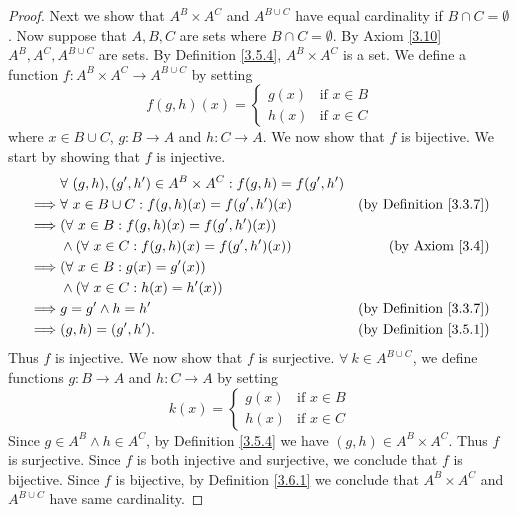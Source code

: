 \begin{proof}
    Next we show that \(A^B \times A^C\) and \(A^{B \cup C}\) have equal cardinality if \(B \cap C = \emptyset\).
    Now suppose that \(A, B, C\) are sets where \(B \cap C = \emptyset\).
    By Axiom \ref{3.10} \(A^B, A^C, A^{B \cup C}\) are sets.
    By Definition \ref{3.5.4}, \(A^B \times A^C\) is a set.
    We define a function \(f : A^B \times A^C \to A^{B \cup C}\) by setting
    \[
        f(g, h)(x) = \begin{cases}
            g(x) & \text{if } x \in B \\
            h(x) & \text{if } x \in C
        \end{cases}
    \]
    where \(x \in B \cup C\), \(g : B \to A\) and \(h : C \to A\).
    We now show that \(f\) is bijective.
    We start by showing that \(f\) is injective.
    \begin{align*}
                 & \forall\ (g, h), (g', h') \in A^B \times A^C : f(g, h) = f(g', h')                                      \\
        \implies & \forall\ x \in B \cup C : f(g, h)(x) = f(g', h')(x)                & \text{(by Definition \ref{3.3.7})} \\
        \implies & (\forall\ x \in B : f(g, h)(x) = f(g', h')(x))                                                          \\
                 & \land (\forall\ x \in C : f(g, h)(x) = f(g', h')(x))               & \text{(by Axiom \ref{3.4})}        \\
        \implies & (\forall\ x \in B : g(x) = g'(x))                                                                       \\
                 & \land (\forall\ x \in C : h(x) = h'(x))                                                                 \\
        \implies & g = g' \land h = h'                                                & \text{(by Definition \ref{3.3.7})} \\
        \implies & (g, h) = (g', h').                                                 & \text{(by Definition \ref{3.5.1})}
    \end{align*}
    Thus \(f\) is injective.
    We now show that \(f\) is surjective.
    \(\forall\ k \in A^{B \cup C}\), we define functions \(g : B \to A\) and \(h : C \to A\) by setting
    \[
        k(x) = \begin{cases}
            g(x) & \text{if } x \in B \\
            h(x) & \text{if } x \in C
        \end{cases}
    \]
    Since \(g \in A^B \land h \in A^C\), by Definition \ref{3.5.4} we have \((g, h) \in A^B \times A^C\).
    Thus \(f\) is surjective.
    Since \(f\) is both injective and surjective, we conclude that \(f\) is bijective.
    Since \(f\) is bijective, by Definition \ref{3.6.1} we conclude that \(A^B \times A^C\) and \(A^{B \cup C}\) have same cardinality.


\end{proof}
